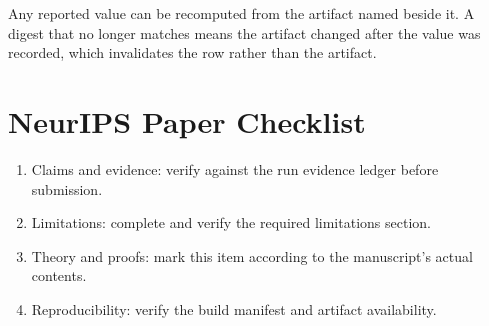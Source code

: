 \documentclass{article}
\begin{document}
Any reported value can be recomputed from the artifact named beside it. A digest that no longer matches means the artifact changed after the value was recorded, which invalidates the row rather than the artifact.







\section*{NeurIPS Paper Checklist}
\begin{enumerate}
  \item Claims and evidence: verify against the run evidence ledger before submission.
  \item Limitations: complete and verify the required limitations section.
  \item Theory and proofs: mark this item according to the manuscript's actual contents.
  \item Reproducibility: verify the build manifest and artifact availability.
\end{enumerate}
\end{document}
